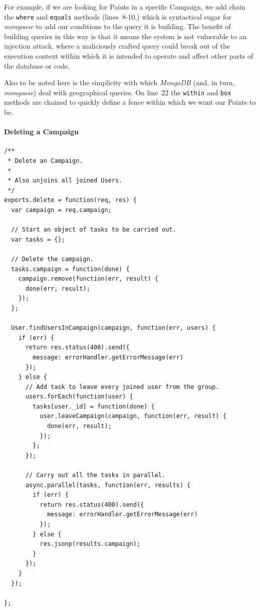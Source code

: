 \documentclass{article}
\begin{document}
	For example, if we are looking for Points in a specific Campaign, we add chain the \texttt{where} and \texttt{equals} methods (lines~8-10,) 		 which is syntactical sugar for \emph{mongoose} to add our conditions to the query it is building. The benefit of building queries in this way is that it means the system is not vulnerable to an injection attack, where a maliciously crafted query could break out of the execution context within which it is intended to operate and affect other parts of the database or code.

	Also to be noted here is the simplicity with which \emph{MongoDB} (and, in turn, \emph{mongoose}) deal with geographical queries. On line~22 the \texttt{within} and \texttt{box} methods are chained to quickly define a fence within which we want our Points to be.

	\paragraph{Deleting a Campaign}

	\begin{verbatim}
/**
 * Delete an Campaign.
 *
 * Also unjoins all joined Users.
 */
exports.delete = function(req, res) {
  var campaign = req.campaign;

  // Start an object of tasks to be carried out.
  var tasks = {};

  // Delete the campaign.
  tasks.campaign = function(done) {
    campaign.remove(function(err, result) {
      done(err, result);
    });
  };

  User.findUsersInCampaign(campaign, function(err, users) {
    if (err) {
      return res.status(400).send({
        message: errorHandler.getErrorMessage(err)
      });
    } else {
      // Add task to leave every joined user from the group.
      users.forEach(function(user) {
        tasks[user._id] = function(done) {
          user.leaveCampaign(campaign, function(err, result) {
            done(err, result);
          });
        };
      });

      // Carry out all the tasks in parallel.
      async.parallel(tasks, function(err, results) {
        if (err) {
          return res.status(400).send({
            message: errorHandler.getErrorMessage(err)
          });
        } else {
          res.jsonp(results.campaign);
        }
      });
    }
  });

};
	\end{verbatim}
\end{document}

